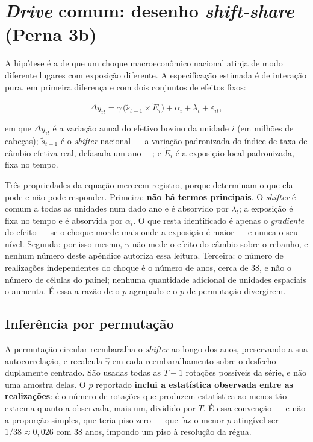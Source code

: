 \FloatBarrier

\section{\emph{Drive} comum: desenho \emph{shift-share} (Perna 3b)}
\label{ap:shiftshare}

A hipótese é a de que um choque macroeconômico nacional atinja de modo
diferente lugares com exposição diferente. A especificação estimada é de
interação pura, em primeira diferença e com dois conjuntos de efeitos fixos:

\begin{equation}
\Delta y_{it} = \gamma\,\bigl(\tilde{s}_{t-1} \times \tilde{E}_i\bigr)
             + \alpha_i + \lambda_t + \varepsilon_{it},
\label{eq:shiftshare}
\end{equation}

\noindent em que \(\Delta y_{it}\) é a variação anual do efetivo bovino da
unidade \(i\) (em milhões de cabeças); \(\tilde{s}_{t-1}\) é o \emph{shifter}
nacional --- a variação padronizada do índice de taxa de câmbio efetiva real,
defasada um ano ---; e \(\tilde{E}_i\) é a exposição local padronizada, fixa no
tempo.

Três propriedades da equação merecem registro, porque determinam o que ela pode
e não pode responder. Primeira: \textbf{não há termos principais}. O
\emph{shifter} é comum a todas as unidades num dado ano e é absorvido por
\(\lambda_t\); a exposição é fixa no tempo e é absorvida por \(\alpha_i\). O
que resta identificado é apenas o \emph{gradiente} do efeito --- se o choque
morde mais onde a exposição é maior --- e nunca o seu nível. Segunda: por
isso mesmo, \(\gamma\) não mede o efeito do câmbio sobre o rebanho, e nenhum
número deste apêndice autoriza essa leitura. Terceira: o número de realizações
independentes do choque é o número de anos, cerca de 38, e não o número de
células do painel; nenhuma quantidade adicional de unidades espaciais o
aumenta. É essa a razão de o \(p\) agrupado e o \(p\) de permutação divergirem.

\subsection{Inferência por permutação}

A permutação circular reembaralha o \emph{shifter} ao longo dos anos,
preservando a sua autocorrelação, e recalcula \(\hat{\gamma}\) em cada
reembaralhamento sobre o desfecho duplamente centrado. São usadas todas as
\(T-1\) rotações possíveis da série, e não uma amostra delas. O \(p\) reportado
\textbf{inclui a estatística observada entre as realizações}: é o número de
rotações que produzem estatística ao menos tão extrema quanto a observada, mais
um, dividido por \(T\). É essa convenção --- e não a proporção simples, que
teria piso zero --- que faz o menor \(p\) atingível ser \(1/38 \approx
0{,}026\) com 38 anos, impondo um piso à resolução da régua.

